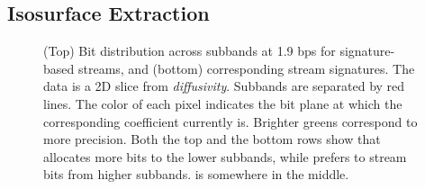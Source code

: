 \subsection{Isosurface Extraction}\label{sec:isocontour}


\begin{figure}[!b]
\vspace{-1em}
\centering
 \vspace{-0.5em}
\caption{(Top) Bit distribution across subbands at 1.9 bps for signature-based streams, and (bottom)
corresponding stream signatures. The data is a 2D slice from \emph{diffusivity}. Subbands are
separated by red lines. The color of each pixel indicates the bit plane at which the corresponding
coefficient currently is. Brighter greens correspond to more precision. Both the top and the bottom
rows show that \shsg allocates more bits to the lower subbands, while \slsg prefers to stream bits
from higher subbands. \srsg is somewhere in the middle.}
\label{fig:bit-distrib}
\vspace{-1.5em}
\end{figure}

